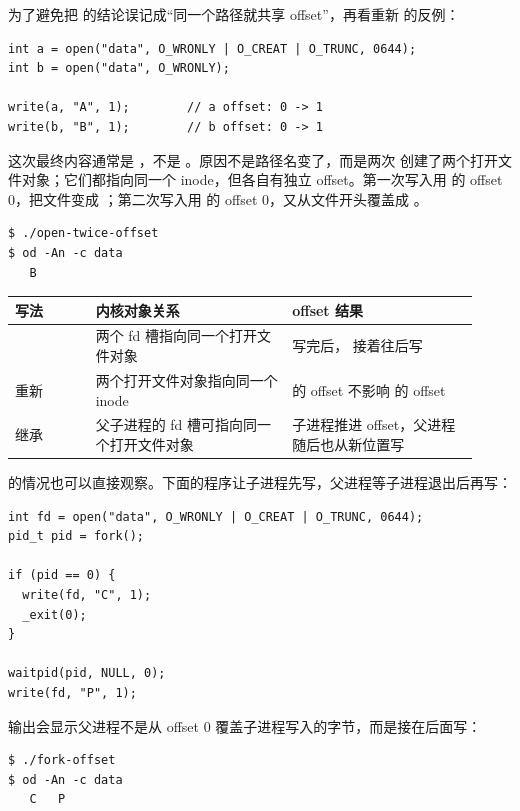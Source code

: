 为了避免把  的结论误记成“同一个路径就共享 offset”，再看重新  的反例：

\begin{lstlisting}
int a = open("data", O_WRONLY | O_CREAT | O_TRUNC, 0644);
int b = open("data", O_WRONLY);

write(a, "A", 1);        // a offset: 0 -> 1
write(b, "B", 1);        // b offset: 0 -> 1
\end{lstlisting}

这次最终内容通常是 ，不是 。原因不是路径名变了，而是两次  创建了两个打开文件对象；它们都指向同一个 inode，但各自有独立 offset。第一次写入用  的 offset 0，把文件变成 ；第二次写入用  的 offset 0，又从文件开头覆盖成 。

\begin{lstlisting}
$ ./open-twice-offset
$ od -An -c data
   B
\end{lstlisting}

\begin{longtable}{|L{0.16\linewidth}|L{0.39\linewidth}|L{0.37\linewidth}|}
\toprule
写法 & 内核对象关系 & offset 结果 \\
\midrule
{} & 两个 fd 槽指向同一个打开文件对象 &  写完后， 接着往后写 \\\tablerowrule
重新  & 两个打开文件对象指向同一个 inode &  的 offset 不影响  的 offset \\\tablerowrule
{} 继承 & 父子进程的 fd 槽可指向同一个打开文件对象 & 子进程推进 offset，父进程随后也从新位置写 \\
\bottomrule
\end{longtable}

 的情况也可以直接观察。下面的程序让子进程先写，父进程等子进程退出后再写：

\begin{lstlisting}
int fd = open("data", O_WRONLY | O_CREAT | O_TRUNC, 0644);
pid_t pid = fork();

if (pid == 0) {
  write(fd, "C", 1);
  _exit(0);
}

waitpid(pid, NULL, 0);
write(fd, "P", 1);
\end{lstlisting}

输出会显示父进程不是从 offset 0 覆盖子进程写入的字节，而是接在后面写：

\begin{lstlisting}
$ ./fork-offset
$ od -An -c data
   C   P
\end{lstlisting}

